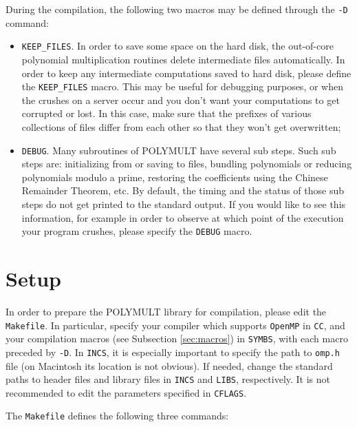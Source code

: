 \documentclass[a4paper,10pt]{article}
\newcommand{\code}{\lstinline}
\begin{document}
During the compilation, the following two macros may be defined through the \code{-D} command:

\begin{itemize}
\item \code{KEEP_FILES}. In order to save some space on the hard disk, the out-of-core polynomial multiplication routines delete intermediate files automatically. In order to keep any intermediate computations saved to hard disk, please define the \code{KEEP_FILES} macro. This may be useful for debugging purposes, or when the crushes on a server occur and you don't want your computations to get corrupted or lost. In this case, make sure that the prefixes of various collections of files differ from each other so that they won't get overwritten;

\item \code{DEBUG}. Many subroutines of POLYMULT have several sub steps. Such sub steps are: initializing from or saving to files, bundling polynomials or reducing polynomials modulo a prime, restoring the coefficients using the Chinese Remainder Theorem, etc. By default, the timing and the status of those sub steps do not get printed to the standard output. If you would like to see this information, for example in order to observe at which point of the execution your program crushes, please specify the \code{DEBUG} macro.
\end{itemize}





\section{Setup}

In order to prepare the POLYMULT library for compilation, please edit the \code{Makefile}. In particular, specify your compiler which supports \code{OpenMP} in \code{CC}, and your compilation macros (see Subsection \ref{sec:macros}) in \code{SYMBS}, with each macro preceded by \code{-D}. In \code{INCS}, it is especially important to specify the path to \code{omp.h} file (on Macintosh its location is not obvious). If needed, change the standard paths to header files and library files in \code{INCS} and \code{LIBS}, respectively. It is not recommended to edit the parameters specified in \code{CFLAGS}.

The \code{Makefile} defines the following three commands:
\end{document}
